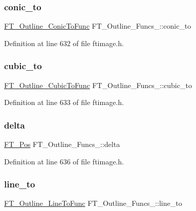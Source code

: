 \subsubsection{\texorpdfstring{conic\_to}{conic\_to}}
{\footnotesize\ttfamily \mbox{\hyperlink{ftimage_8h_a44b83dd26e7f37eae86aee33ff3efd9b}{F\+T\+\_\+\+Outline\+\_\+\+Conic\+To\+Func}} F\+T\+\_\+\+Outline\+\_\+\+Funcs\+\_\+\+::conic\+\_\+to}



Definition at line 632 of file ftimage.\+h.

\mbox{\label{struct_f_t___outline___funcs___aa3e0c1bacb181a5f43c104ab7f72cfda}} 
\subsubsection{\texorpdfstring{cubic\_to}{cubic\_to}}
{\footnotesize\ttfamily \mbox{\hyperlink{ftimage_8h_a9c6f8d42a1660a57f55614baaa4b61b2}{F\+T\+\_\+\+Outline\+\_\+\+Cubic\+To\+Func}} F\+T\+\_\+\+Outline\+\_\+\+Funcs\+\_\+\+::cubic\+\_\+to}



Definition at line 633 of file ftimage.\+h.

\mbox{\label{struct_f_t___outline___funcs___a3c3121398b3ff564b4f3fd5b2a318e5e}} 
\subsubsection{\texorpdfstring{delta}{delta}}
{\footnotesize\ttfamily \mbox{\hyperlink{ftimage_8h_af5f230f4b253d4c7715fd2e595614c90}{F\+T\+\_\+\+Pos}} F\+T\+\_\+\+Outline\+\_\+\+Funcs\+\_\+\+::delta}



Definition at line 636 of file ftimage.\+h.

\mbox{\label{struct_f_t___outline___funcs___a876fc8ca7541786cd3c4ec3806f88360}} 
\subsubsection{\texorpdfstring{line\_to}{line\_to}}
{\footnotesize\ttfamily \mbox{\hyperlink{ftimage_8h_a522526513387d998682d59515fe93ccf}{F\+T\+\_\+\+Outline\+\_\+\+Line\+To\+Func}} F\+T\+\_\+\+Outline\+\_\+\+Funcs\+\_\+\+::line\+\_\+to}



